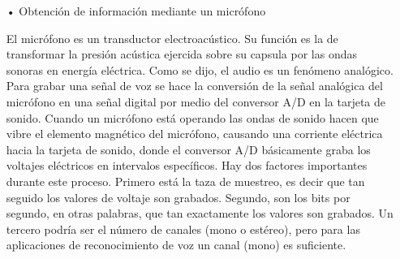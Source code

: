 \begin{enumerate}
\newpage
\begin{enumerate}
\item[•]Obtención de información mediante un micrófono
\par
El micrófono es un transductor electroacústico. Su función es la de transformar la presión acústica ejercida sobre su capsula por las ondas sonoras en energía eléctrica.
\vskip 0.5cm
Como se dijo, el audio es un fenómeno analógico. Para grabar una señal de voz se hace la conversión de la señal analógica del micrófono en una señal digital por medio del conversor A/D en la tarjeta de sonido. Cuando un micrófono está operando las ondas de sonido hacen que vibre el elemento magnético del micrófono, causando una corriente eléctrica hacia la tarjeta de sonido, donde el conversor A/D básicamente graba los voltajes eléctricos en intervalos específicos.
\vskip 0.5cm
Hay dos factores importantes durante este proceso. Primero está la taza de muestreo, es decir que tan seguido los valores de voltaje son grabados. Segundo, son los bits por segundo, en otras palabras, que tan exactamente los valores son grabados. Un tercero podría ser el número de canales (mono o estéreo), pero para las aplicaciones de reconocimiento de voz un canal (mono) es suficiente.


\end{enumerate}
\end{enumerate}
